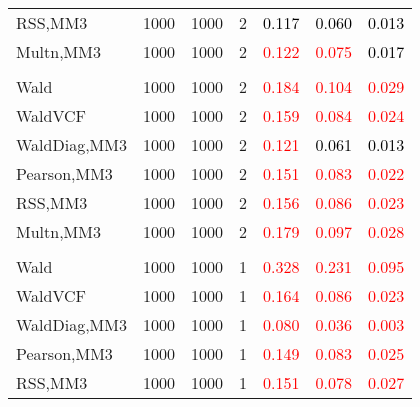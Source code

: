 \documentclass[
]{article}
\begin{document}
\begin{table}[H]
{\begin{tabular}[t]{lrrrrrr}
\hspace{1em}RSS,MM3 & 1000 & 1000 & 2 & \textcolor{black}{0.117} & \textcolor{black}{0.060} & \textcolor{black}{0.013}\\
\hspace{1em}Multn,MM3 & 1000 & 1000 & 2 & \textcolor{red}{0.122} & \textcolor{red}{0.075} & \textcolor{black}{0.017}\\
\addlinespace[0.3em]
\multicolumn{7}{l}{\textbf{1F 15V}}\\
\hspace{1em}Wald & 1000 & 1000 & 2 & \textcolor{red}{0.184} & \textcolor{red}{0.104} & \textcolor{red}{0.029}\\
\hspace{1em}WaldVCF & 1000 & 1000 & 2 & \textcolor{red}{0.159} & \textcolor{red}{0.084} & \textcolor{red}{0.024}\\
\hspace{1em}WaldDiag,MM3 & 1000 & 1000 & 2 & \textcolor{red}{0.121} & \textcolor{black}{0.061} & \textcolor{black}{0.013}\\
\hspace{1em}Pearson,MM3 & 1000 & 1000 & 2 & \textcolor{red}{0.151} & \textcolor{red}{0.083} & \textcolor{red}{0.022}\\
\hspace{1em}RSS,MM3 & 1000 & 1000 & 2 & \textcolor{red}{0.156} & \textcolor{red}{0.086} & \textcolor{red}{0.023}\\
\hspace{1em}Multn,MM3 & 1000 & 1000 & 2 & \textcolor{red}{0.179} & \textcolor{red}{0.097} & \textcolor{red}{0.028}\\
\addlinespace[0.3em]
\multicolumn{7}{l}{\textbf{2F 10V}}\\
\hspace{1em}Wald & 1000 & 1000 & 1 & \textcolor{red}{0.328} & \textcolor{red}{0.231} & \textcolor{red}{0.095}\\
\hspace{1em}WaldVCF & 1000 & 1000 & 1 & \textcolor{red}{0.164} & \textcolor{red}{0.086} & \textcolor{red}{0.023}\\
\hspace{1em}WaldDiag,MM3 & 1000 & 1000 & 1 & \textcolor{red}{0.080} & \textcolor{red}{0.036} & \textcolor{red}{0.003}\\
\hspace{1em}Pearson,MM3 & 1000 & 1000 & 1 & \textcolor{red}{0.149} & \textcolor{red}{0.083} & \textcolor{red}{0.025}\\
\hspace{1em}RSS,MM3 & 1000 & 1000 & 1 & \textcolor{red}{0.151} & \textcolor{red}{0.078} & \textcolor{red}{0.027}\\

\end{tabular}}
\end{table}
\end{document}
